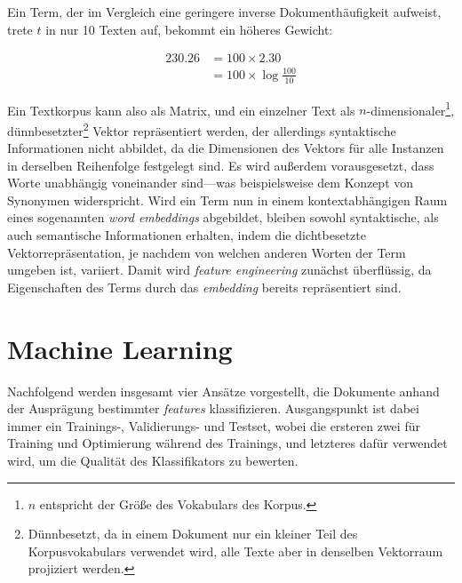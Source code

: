 Ein Term, der im Vergleich eine geringere inverse Dokumenthäufigkeit aufweist, trete $t$ in nur 10 Texten auf, 
bekommt ein höheres Gewicht:

\begin{equation}
  \label{eq:eqn3}
    \begin{aligned}
      230.26 &= 100 \times 2.30        \\
            &=100 \times \log \frac{100}{10}        
    \end{aligned}
\end{equation}

Ein Textkorpus kann also als Matrix, und ein einzelner Text als $n$-dimensionaler\footnote{$n$ entspricht der Größe des Vokabulars des Korpus.}, dünnbesetzter\footnote{Dünnbesetzt, da in einem Dokument nur ein kleiner Teil des Korpusvokabulars verwendet wird, alle Texte aber in denselben Vektorraum projiziert werden.} Vektor repräsentiert werden, der allerdings syntaktische Informationen nicht abbildet, da die Dimensionen des Vektors für alle Instanzen in derselben Reihenfolge festgelegt sind. Es wird außerdem vorausgesetzt, dass Worte unabhängig voneinander sind---was beispielsweise dem Konzept von Synonymen widerspricht. Wird ein Term nun in einem kontextabhängigen Raum eines 
sogenannten \textit{word embeddings} abgebildet, bleiben sowohl syntaktische, als auch semantische Informationen erhalten, indem die dichtbesetzte Vektorrepräsentation, je nachdem von welchen anderen Worten der Term umgeben ist, variiert. Damit wird \textit{feature engineering} zunächst überflüssig, da Eigenschaften des Terms durch das \textit{embedding} bereits repräsentiert sind.


\section{Machine Learning}
Nachfolgend werden insgesamt vier Ansätze vorgestellt, die Dokumente anhand der Ausprägung bestimmter \textit{features} klassifizieren. Ausgangspunkt ist dabei immer ein Trainings-, Validierungs- und Testset, wobei die ersteren zwei für Training und Optimierung während des Trainings, und letzteres dafür verwendet wird, um die Qualität des Klassifikators zu bewerten.

